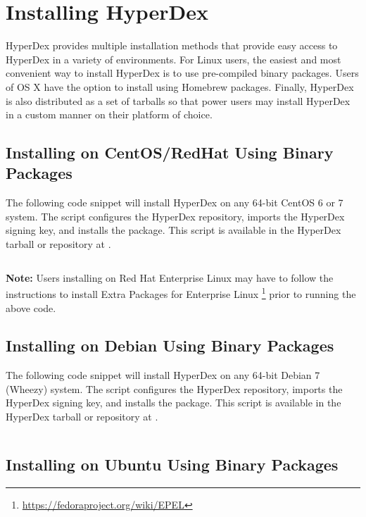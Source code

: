 \chapter{Installing HyperDex}
\label{chap:installation}

HyperDex provides multiple installation methods that provide easy access to
HyperDex in a variety of environments.  For Linux users, the easiest and most
convenient way to install HyperDex is to use pre-compiled binary packages.
Users of OS X have the option to install using Homebrew packages.  Finally,
HyperDex is also distributed as a set of tarballs so that power users may
install HyperDex in a custom manner on their platform of choice.

\section{Installing on CentOS/RedHat Using Binary Packages}

The following code snippet will install HyperDex on any 64-bit CentOS 6 or 7
system.  The script configures the HyperDex repository, imports the HyperDex
signing key, and installs the  package.  This script is available
in the HyperDex tarball or repository at .

\inputminted[frame=lines,framesep=2mm,firstline=5]{bash}{\topdir/install/centos-packages.sh}

\noindent\textbf{Note:}  Users installing on Red Hat Enterprise Linux may have
to follow the instructions to install Extra Packages for Enterprise Linux
\footnote{\url{https://fedoraproject.org/wiki/EPEL}} prior to running the above
code.

\section{Installing on Debian Using Binary Packages}

The following code snippet will install HyperDex on any 64-bit Debian 7 (Wheezy)
system.  The script configures the HyperDex repository, imports the HyperDex
signing key, and installs the  package.  This script is available
in the HyperDex tarball or repository at .

\inputminted[frame=lines,framesep=2mm,firstline=5]{bash}{\topdir/install/debian7-packages.sh}

\section{Installing on Ubuntu Using Binary Packages}

